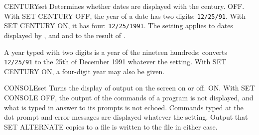 \begin{XbaseEntry}{CENTURY}{set}
Determines whether dates are displayed with the century.
\Syntax
{}
\Defaults
OFF.
\Usage
With SET CENTURY OFF, the year of a date has two digits: \texttt{12/25/91}.
With SET CENTURY ON, it has four: \texttt{12/25/1991}.  The setting applies to
dates displayed by ,  and  and to the result of
.

A year typed with two digits is a year of the nineteen hundreds:
 converts \texttt{12/25/91} to the 25th of December 1991 whatever the
setting.  With SET CENTURY ON, a four-digit year may also be given.
\Examples
{}
\end{XbaseEntry}

\begin{XbaseEntry}{CONSOLE}{set}
Turns the display of output on the screen on or off.
\Syntax
{}
\Defaults
ON.
\Usage
With SET CONSOLE OFF, the output of the commands of a program is not
displayed, and what is typed in answer to its prompts is not echoed.
Commands typed at the dot prompt and error messages are displayed whatever
the setting.  Output that SET ALTERNATE copies to a file is written to the
file in either case.
\end{XbaseEntry}

